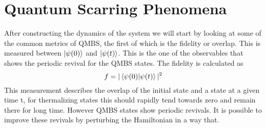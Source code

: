 \section{Quantum Scarring Phenomena}
After constructing the dynamics of the system we will start by looking at some of the common metrics of QMBS, the first of which is the fidelity or overlap. This is measured between $\ket{\psi(0)}$ and $\ket{\psi(t)}$.
This is the one of the observables that shows the periodic revival for the QMBS states. The fidelity is calculated as 
\begin{equation}\label{eq:fidelity}
f = |\bra{\psi(0)}\ket{\psi(t)}|^2
\end{equation}
This measurement describes the overlap of the initial state and a state at a given time t, for thermalizing states this should rapidly tend towards zero and remain there for long time. However QMBS states show periodic revivals. It is possible to improve these revivals by perturbing the Hamiltonian in a way that.

